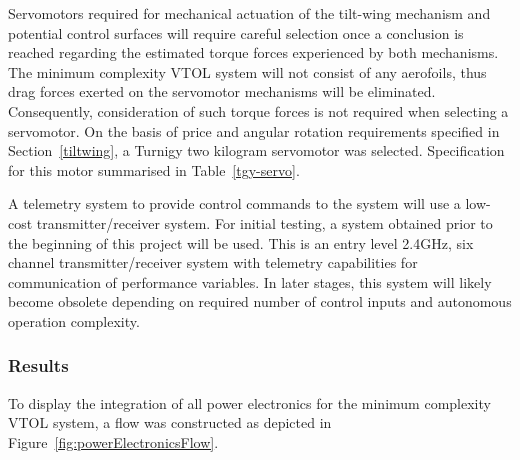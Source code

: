Servomotors required for mechanical actuation of the tilt-wing mechanism and potential control surfaces will require careful selection once a conclusion is reached regarding the estimated torque forces experienced by both mechanisms. The minimum complexity VTOL system will not consist of any aerofoils, thus drag forces exerted on the servomotor mechanisms will be eliminated. Consequently, consideration of such torque forces is not required when selecting a servomotor. On the basis of price and angular rotation requirements specified in Section~\ref{tiltwing}, a Turnigy two kilogram servomotor was selected. Specification for this motor summarised in Table~\ref{tgy-servo}.

\begin{table}[H]
\caption{Turnigy TGY 518-OMG Specifications}
\label{tgy-servo}
\end{table}

A telemetry system to provide control commands to the system will use a low-cost transmitter/receiver system. For initial testing, a system obtained prior to the beginning of this project will be used. This is an entry level 2.4GHz, six channel transmitter/receiver system with telemetry capabilities for communication of performance variables. In later stages, this system will likely become obsolete depending on required number of control inputs and autonomous operation complexity.
\clearpage
\subsubsection{Results}
To display the integration of all power electronics for the minimum complexity VTOL system, a flow was constructed as depicted in Figure~\ref{fig:powerElectronicsFlow}.

